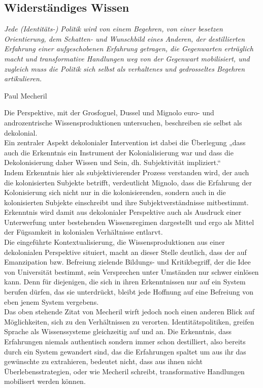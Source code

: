 \subsection{Widerständiges Wissen}
\epigraph{\textit{ 
Jede (Identitäts-) Politik wird von einem Begehren, von einer besetzen
Orientierung, dem Schatten- und Wunschbild eines Anderen, der destillierten
Erfahrung einer aufgeschobenen Erfahrung getragen, die Gegenwarten erträglich
macht und transformative Handlungen weg von der Gegenwart mobilisiert, und
zugleich muss die Politik sich selbst als verhaltenes und gedrosseltes Begehren
artikulieren.}}{Paul Mecheril\footnotemark}  

Die Perspektive, mit der Grosfoguel, Dussel und Mignolo euro- und
androzentrische Wissensproduktionen untersuchen, beschreiben sie selbst als
dekolonial.\\
Ein zentraler Aspekt dekolonialer Intervention ist dabei die
Überlegung „dass auch die Erkenntnis ein Instrument der Kolonialisierung war
und dass die Dekolonisierung daher Wissen und Sein, dh. Subjektivität
impliziert.“\footnotemark{}\\
Indem Erkenntnis hier als subjektivierender Prozess verstanden wird, der auch
die kolonisierten Subjekte betrifft, verdeutlicht Mignolo, dass die Erfahrung
der Kolonisierung sich nicht nur in die kolonisierenden, sondern auch in die
kolonisierten Subjekte einschreibt und ihre Subjektverständnisse mitbestimmt.
Erkenntnis wird damit aus dekolonialer Perspektive auch als Ausdruck einer
Unterwerfung unter bestehenden Wissensregimen dargestellt und ergo als Mittel
der Fügsamkeit in kolonialen Verhältnisse entlarvt.\\

\noindent Die eingeführte Kontextualisierung, die Wissensproduktionen aus einer
dekolonialen Perspektive situiert, macht an dieser Stelle deutlich, dass der
auf Emanzipation bzw. Befreiung zielende Bildungs- und Kritikbegriff, der die
Idee von Universität bestimmt, sein Versprechen unter Umständen nur schwer
einlösen kann. Denn für diejenigen, die sich in ihren Erkenntnissen nur auf
ein System berufen dürfen, das sie unterdrückt, bleibt jede Hoffnung auf eine
Befreiung von eben jenem System vergebens. \\

\noindent Das oben stehende Zitat von Mecheril
wirft jedoch noch einen anderen Blick auf Möglichkeiten, sich zu den
Verhältnissen zu verorten. Identitätspolitiken, greifen Sprache als
Wissenssysteme gleichzeitig auf und an. Die Erkenntnis, dass Erfahrungen niemals
authentisch sondern immer schon destilliert, also bereits durch ein System
gewandert sind, das die Erfahrungen spaltet um aus ihr das gewünschte zu
extrahieren, bedeutet nicht, dass aus ihnen nicht Überlebensstrategien, oder wie Mecheril schreibt, transformative Handlungen mobilisert werden können.\\

